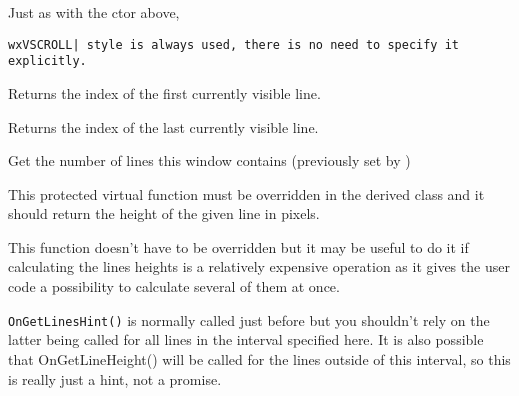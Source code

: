 Just as with the ctor above, {\tt wxVSCROLL| style is always used, there is no
need to specify it explicitly.


\label{wxvscrolledwindowgetfirstvisibleline}


Returns the index of the first currently visible line.


\label{wxvscrolledwindowgetlastvisibleline}


Returns the index of the last currently visible line.


\label{wxvscrolledwindowgetlinecount}


Get the number of lines this window contains (previously set by 
)


\label{wxvscrolledwindowongetlineheight}


This protected virtual function must be overridden in the derived class and it
should return the height of the given line in pixels.




\label{wxvscrolledwindowongetlineshint}


This function doesn't have to be overridden but it may be useful to do
it if calculating the lines heights is a relatively expensive operation
as it gives the user code a possibility to calculate several of them at
once.

{\tt OnGetLinesHint()} is normally called just before 
 but you
shouldn't rely on the latter being called for all lines in the interval
specified here. It is also possible that OnGetLineHeight() will be
called for the lines outside of this interval, so this is really just a
hint, not a promise.

}
